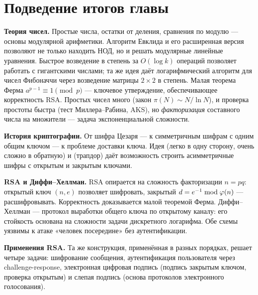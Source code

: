 \section*{Подведение итогов главы}

\begin{tcolorbox}[
  enhanced, sharp corners, boxrule=0pt,
  colback=prosvCream, leftrule=4pt, colframe=prosvBlue,
  left=12pt, right=12pt, top=10pt, bottom=10pt,
  before skip=0.5em, after skip=1.5em,
  title={\textbf{\color{prosvBlue}\large Главное в этой главе}},
  fonttitle=\bfseries
]
\textbf{Теория чисел.} Простые числа, остатки от деления, сравнения по модулю --- основы модулярной арифметики. Алгоритм Евклида и его расширенная версия позволяют не только находить НОД, но и решать модулярные линейные уравнения. Быстрое возведение в степень за $O(\log k)$ операций позволяет работать с гигантскими числами; та же идея даёт логарифмический алгоритм для чисел Фибоначчи через возведение матрицы $2{\times}2$ в степень. Малая теорема Ферма $a^{p-1} \equiv 1 \pmod p$ --- ключевое утверждение, обеспечивающее корректность RSA. Простых чисел много (закон $\pi(N) \sim N/\ln N$), и проверка простоты быстра (тест Миллера--Рабина, AKS), но \emph{факторизация} составного числа на множители --- задача экспоненциальной сложности.

\textbf{История криптографии.} От шифра Цезаря --- к симметричным шифрам с одним общим ключом --- к проблеме доставки ключа. Идея  (легко в одну сторону, очень сложно в обратную) и  (трапдор) даёт возможность строить асимметричные шифры с открытым и закрытым ключами.

\textbf{RSA и Диффи--Хеллман.} RSA опирается на сложность факторизации $n = pq$: открытый ключ $(n, e)$ позволяет шифровать, закрытый $d = e^{-1} \bmod \varphi(n)$ --- расшифровывать. Корректность доказывается малой теоремой Ферма. Диффи--Хеллман --- протокол выработки общего ключа по открытому каналу: его стойкость основана на сложности задачи дискретного логарифма. Обе схемы уязвимы к атаке «человек посередине» без аутентификации.

\textbf{Применения RSA.} Та же конструкция, применённая в разных порядках, решает четыре задачи: шифрование сообщения, аутентификация пользователя через challenge-response, электронная цифровая подпись (подпись закрытым ключом, проверка открытым) и слепая подпись (основа протоколов электронного голосования).


\end{tcolorbox}
